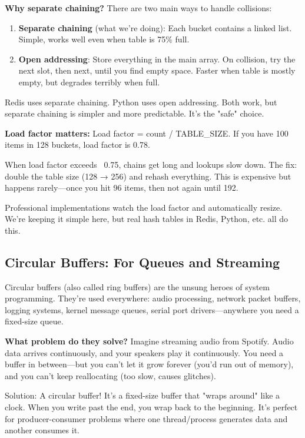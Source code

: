 \begin{notebox}
\textbf{Why separate chaining?} There are two main ways to handle collisions:

\begin{enumerate}
    \item \textbf{Separate chaining} (what we're doing): Each bucket contains a linked list. Simple, works well even when table is 75\% full.

    \item \textbf{Open addressing}: Store everything in the main array. On collision, try the next slot, then next, until you find empty space. Faster when table is mostly empty, but degrades terribly when full.
\end{enumerate}

Redis uses separate chaining. Python uses open addressing. Both work, but separate chaining is simpler and more predictable. It's the "safe" choice.

\textbf{Load factor matters:} Load factor = count / TABLE\_SIZE. If you have 100 items in 128 buckets, load factor is 0.78.

When load factor exceeds ~0.75, chains get long and lookups slow down. The fix: double the table size (128 → 256) and rehash everything. This is expensive but happens rarely—once you hit 96 items, then not again until 192.

Professional implementations watch the load factor and automatically resize. We're keeping it simple here, but real hash tables in Redis, Python, etc. all do this.
\end{notebox}

\subsection{Circular Buffers: For Queues and Streaming}

Circular buffers (also called ring buffers) are the unsung heroes of system programming. They're used everywhere: audio processing, network packet buffers, logging systems, kernel message queues, serial port drivers—anywhere you need a fixed-size queue.

\textbf{What problem do they solve?} Imagine streaming audio from Spotify. Audio data arrives continuously, and your speakers play it continuously. You need a buffer in between—but you can't let it grow forever (you'd run out of memory), and you can't keep reallocating (too slow, causes glitches).

Solution: A circular buffer! It's a fixed-size buffer that "wraps around" like a clock. When you write past the end, you wrap back to the beginning. It's perfect for producer-consumer problems where one thread/process generates data and another consumes it.

